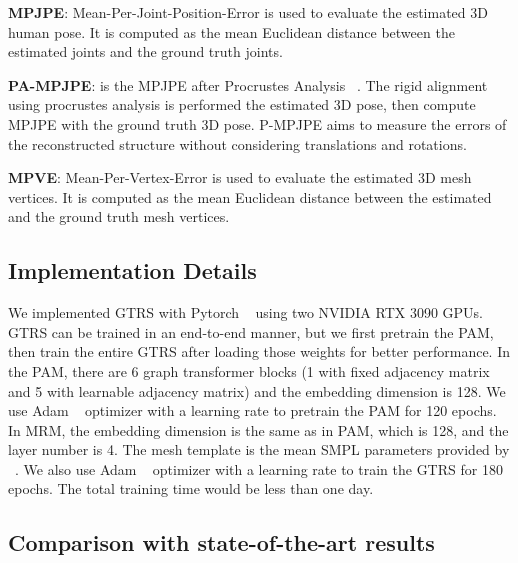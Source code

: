 \documentclass[sigconf]{acmart}
\begin{document}
\textbf{MPJPE}: Mean-Per-Joint-Position-Error is used to evaluate the estimated 3D human pose. It is computed as the mean Euclidean distance between the estimated joints and the ground truth joints. 


\textbf{PA-MPJPE}: is the MPJPE after Procrustes Analysis ~\cite{grice2009generalized}. The rigid alignment using procrustes analysis is performed the estimated 3D pose, then compute MPJPE with the ground truth 3D pose. P-MPJPE aims to measure the errors of the reconstructed structure without considering translations and rotations. 


\textbf{MPVE}: Mean-Per-Vertex-Error is used to evaluate the estimated 3D mesh vertices. It is computed as the mean Euclidean distance between the estimated and the ground truth mesh vertices. 


\subsection{Implementation Details}

We implemented GTRS with Pytorch ~\cite{PyTorch} using two NVIDIA RTX 3090 GPUs. GTRS can be trained in an end-to-end manner, but we first pretrain the PAM, then train the entire GTRS after loading those weights for better performance. In the PAM, there are 6 graph transformer blocks (1 with fixed adjacency matrix and 5 with learnable adjacency matrix) and the embedding dimension is 128. We use Adam ~\cite{kingma2014adam} optimizer with a learning rate  to pretrain the PAM for 120 epochs. In MRM, the embedding dimension is the same as in PAM, which is 128, and the layer number  is 4. The mesh template  is the mean SMPL parameters provided by ~\cite{Kolotouros2019SPIN}. We also use Adam ~\cite{kingma2014adam} optimizer with a learning rate  to train the GTRS for 180 epochs. The total training time would be less than one day. 
\subsection{Comparison with state-of-the-art results}
\label{sec:comapresota}
\end{document}
